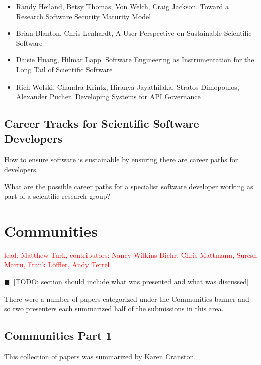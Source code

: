 \documentclass[11pt, oneside]{amsart}
\newcommand{\todo}[1]{{\color{blue}$\blacksquare$~\textsf{[TODO: #1]}}}
\newcommand{\note}[1]{ {\textcolor{red}    { #1 }}}
\begin{document}
\begin{itemize}

\item Randy Heiland, Betsy Thomas, Von Welch, Craig Jackson. Toward a
  Research Software Security Maturity Model \cite{Heiland_WSSSPE}

\item Brian Blanton, Chris Lenhardt, A User Perspective on Sustainable
  Scientific Software \cite{Blanton_WSSSPE}

\item Daisie Huang, Hilmar Lapp. Software Engineering as
  Instrumentation for the Long Tail of Scientific Software
  \cite{Huang_WSSSPE}

\item Rich Wolski, Chandra Krintz, Hiranya Jayathilaka, Stratos
  Dimopoulos, Alexander Pucher. Developing Systems for API Governance
  \cite{Wolski_WSSSPE}

\end{itemize}


\subsection{Career Tracks for Scientific Software Developers}

How to ensure software is sustainable by ensuring there are career
paths for developers.

What are the possible career paths for a specialist software developer working as part of a scientific research group?

\section{Communities} \label{sec:community}

\note{lead: Matthew Turk, contributors: Nancy Wilkins-Diehr, Chris Mattmann, Suresh Marru, Frank L\"{o}ffler, Andy Terrel}

\todo{section should include what was presented and what was discussed}

There were a number of papers categorized under the Communities banner and so two presenters each summarized half of the submissions in this area.

\subsection{Communities Part 1}

This collection of papers was summarized by Karen Cranston.
\end{document}
